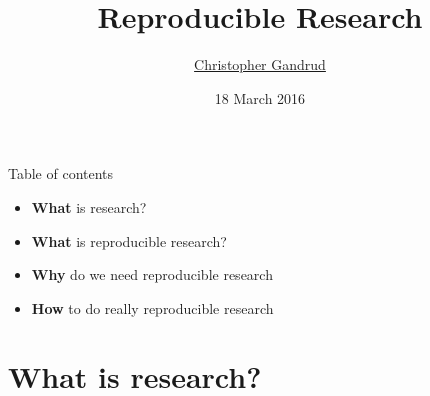 \documentclass[10pt]{beamer}
\title{Reproducible Research}
\subtitle{}
\date{18 March 2016}
\author{
    \href{mailto:christopher.gandrud@city.ac.uk}{Christopher Gandrud}
}
\institute{SG1022, City University London}
\begin{document}
\maketitle

\begin{frame}{Table of contents}

    \begin{itemize}
        \item \textbf{What} is research?

        \item \textbf{What} is reproducible research?

        \item \textbf{Why} do we need reproducible research

        \item \textbf{How} to do really reproducible research
    \end{itemize}

\end{frame}

\section{What is research?}
\end{document}
